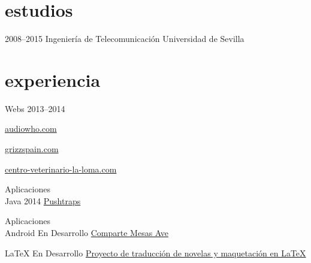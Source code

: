 \documentclass[hidelinks]{friggeri-cv} %
\begin{document}

\section{estudios}

\begin{entrylist}
\entry
{2008--2015}
{Ingeniería {\normalfont de Telecomunicación}}
{Universidad de Sevilla}
{}
\end{entrylist}


\section{experiencia}

\begin{entrylist}
\entry
{Webs}
{}
{2013--2014}
{
\href{http://www.audiowho.com}{audiowho.com}

\href{http://grizzspain.com/}{grizzspain.com}

\href{http://centro-veterinario-la-loma.com/}{centro-veterinario-la-loma.com}
}
\entry
{Aplicaciones \\ Java}
{}
{2014}
{
\href{http://bigomby.github.io/pushtraps/}{Pushtraps}
}

\entry
{Aplicaciones \\ Android}
{}
{En Desarrollo}
{
\href{http://bigomby.github.io/mesas-ave/}{Comparte Mesas Ave}
}

\entry
{\LaTeX}
{}
{En Desarrollo}
{
\href{https://github.com/Bigomby/audiowho-novelas}{Proyecto de traducción de novelas y
maquetación en \LaTeX} 
}

\end{entrylist}

\end{document}
